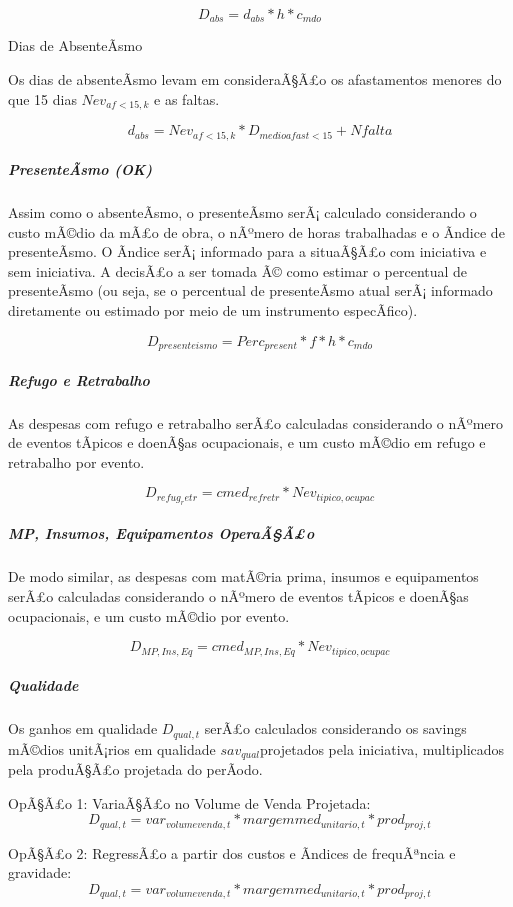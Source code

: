 \documentclass[]{article}
\let\oldsubparagraph\subparagraph
\renewcommand{\subparagraph}[1]{\oldsubparagraph{#1}\mbox{}}
\begin{document}
\[D_{abs} = d_{abs} * h * c_{mdo}\]

Dias de AbsenteÃ­smo

Os dias de absenteÃ­smo levam em consideraÃ§Ã£o os afastamentos menores
do que 15 dias \(Nev_{af<15,k}\) e as faltas.

\[ d_{abs} = Nev_{af<15,k} * D_{medioafast<15} + Nfalta\]

\subparagraph{PresenteÃ­smo (OK)}\label{presenteasmo-ok}

Assim como o absenteÃ­smo, o presenteÃ­smo serÃ¡ calculado considerando
o custo mÃ©dio da mÃ£o de obra, o nÃºmero de horas trabalhadas e o
Ã­ndice de presenteÃ­smo. O Ã­ndice serÃ¡ informado para a situaÃ§Ã£o
com iniciativa e sem iniciativa. A decisÃ£o a ser tomada Ã© como estimar
o percentual de presenteÃ­smo (ou seja, se o percentual de presenteÃ­smo
atual serÃ¡ informado diretamente ou estimado por meio de um instrumento
especÃ­fico).

\[D_{presenteismo} = Perc_{present} * f * h * c_{mdo}\]

\subparagraph{Refugo e Retrabalho}\label{refugo-e-retrabalho}

As despesas com refugo e retrabalho serÃ£o calculadas considerando o
nÃºmero de eventos tÃ­picos e doenÃ§as ocupacionais, e um custo mÃ©dio
em refugo e retrabalho por evento.

\[D_{refug_retr} = cmed_{refretr} * Nev_{tipico,ocupac}\]

\subparagraph{MP, Insumos, Equipamentos
OperaÃ§Ã£o}\label{mp-insumos-equipamentos-operaaao}

De modo similar, as despesas com matÃ©ria prima, insumos e equipamentos
serÃ£o calculadas considerando o nÃºmero de eventos tÃ­picos e doenÃ§as
ocupacionais, e um custo mÃ©dio por evento.

\[D_{MP,Ins,Eq} = cmed_{MP,Ins,Eq} * Nev_{tipico,ocupac}\]

\subparagraph{Qualidade}\label{qualidade}

Os ganhos em qualidade \(D_{qual,t}\) serÃ£o calculados considerando os
savings mÃ©dios unitÃ¡rios em qualidade \(sav_{qual}\)projetados pela
iniciativa, multiplicados pela produÃ§Ã£o projetada do perÃ­odo.

OpÃ§Ã£o 1: VariaÃ§Ã£o no Volume de Venda Projetada:
\[D_{qual,t} = var_{volumevenda,t} * margemmed_{unitario,t} * prod_{proj,t}\]

OpÃ§Ã£o 2: RegressÃ£o a partir dos custos e Ã­ndices de frequÃªncia e
gravidade:
\[D_{qual,t} = var_{volumevenda,t} * margemmed_{unitario,t} * prod_{proj,t}\]
\end{document}
